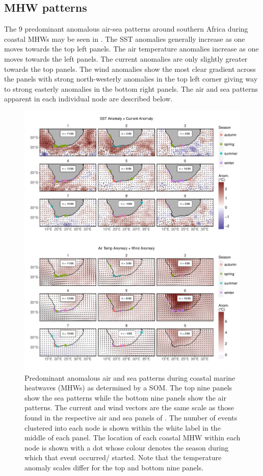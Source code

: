 \documentclass[a4paper,10pt,review]{elsarticle}
\begin{document}
\subsection{MHW patterns}
The 9 predominant anomalous air-sea patterns around southern Africa during coastal MHWs may be seen in . The SST anomalies generally increase as one moves towards the top left panels. The air temperature anomalies increase as one moves towards the left panels. The current anomalies are only slightly greater towards the top panels. The wind anomalies show the most clear gradient across the panels with strong north-westerly anomalies in the top left corner giving way to strong easterly anomalies in the bottom right panels. The air and sea patterns apparent in each individual node are described below.

\begin{figure}
\includegraphics[width=1.0\textwidth]{figure_4.pdf}
\caption{Predominant anomalous air and sea patterns during coastal marine heatwaves (MHWs) as determined by a SOM. The top nine panels show the sea patterns while the bottom nine panels show the air patterns. The current and wind vectors are the same scale as those found in the respective air and sea panels of . The number of events clustered into each node is shown within the white label in the middle of each panel. The location of each coastal MHW within each node is shown with a dot whose colour denotes the season during which that event occurred/ started. Note that the temperature anomaly scales differ for the top and bottom nine panels.}
\label{figure4}
\end{figure}
\end{document}
